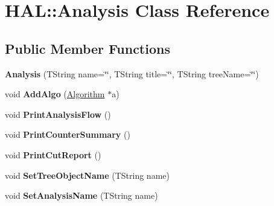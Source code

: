 \hypertarget{class_h_a_l_1_1_analysis}{\section{H\+A\+L\+:\+:Analysis Class Reference}
\label{class_h_a_l_1_1_analysis}
}
\subsection*{Public Member Functions}
\begin{DoxyCompactItemize}
\item 
\hypertarget{class_h_a_l_1_1_analysis_ab95bfff098f6a9543d444078cef3be91}{{\bfseries Analysis} (T\+String name=\char`\"{}\char`\"{}, T\+String title=\char`\"{}\char`\"{}, T\+String tree\+Name=\char`\"{}\char`\"{})}\label{class_h_a_l_1_1_analysis_ab95bfff098f6a9543d444078cef3be91}

\item 
\hypertarget{class_h_a_l_1_1_analysis_a8a4413dce12542ad4a4530f7a506d53b}{void {\bfseries Add\+Algo} (\hyperlink{class_h_a_l_1_1_algorithm}{Algorithm} $\ast$a)}\label{class_h_a_l_1_1_analysis_a8a4413dce12542ad4a4530f7a506d53b}

\item 
\hypertarget{class_h_a_l_1_1_analysis_af755ad7b542eb634144c99b1d142519c}{void {\bfseries Print\+Analysis\+Flow} ()}\label{class_h_a_l_1_1_analysis_af755ad7b542eb634144c99b1d142519c}

\item 
\hypertarget{class_h_a_l_1_1_analysis_ab43d960b19657610674983c5e893e78b}{void {\bfseries Print\+Counter\+Summary} ()}\label{class_h_a_l_1_1_analysis_ab43d960b19657610674983c5e893e78b}

\item 
\hypertarget{class_h_a_l_1_1_analysis_adb9295eeb04813bca9440f617452fec1}{void {\bfseries Print\+Cut\+Report} ()}\label{class_h_a_l_1_1_analysis_adb9295eeb04813bca9440f617452fec1}

\item 
\hypertarget{class_h_a_l_1_1_analysis_a56e97ef132e10b2a5f96c71c5145127b}{void {\bfseries Set\+Tree\+Object\+Name} (T\+String name)}\label{class_h_a_l_1_1_analysis_a56e97ef132e10b2a5f96c71c5145127b}

\item 
\hypertarget{class_h_a_l_1_1_analysis_abcbdb0f6cad2060cf3f6bca7d0eb9ada}{void {\bfseries Set\+Analysis\+Name} (T\+String name)}\label{class_h_a_l_1_1_analysis_abcbdb0f6cad2060cf3f6bca7d0eb9ada}


\end{DoxyCompactItemize}

